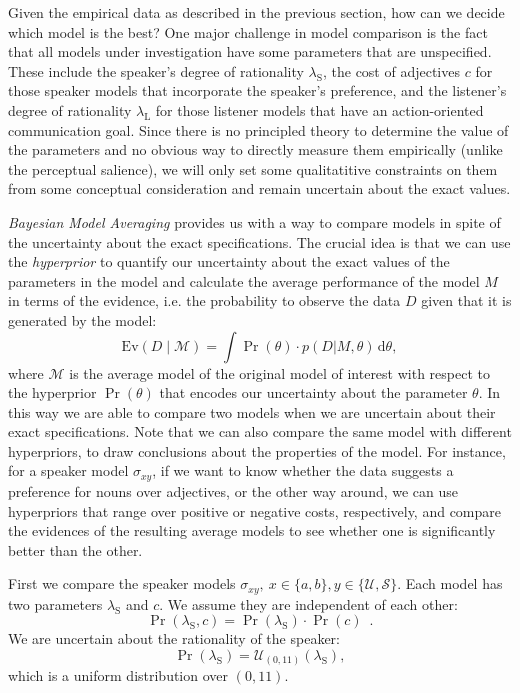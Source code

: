 Given the empirical data as described in the previous section, how can we decide which model is the best? One major challenge in model comparison is the fact that all models under investigation have some parameters that are unspecified. These include the speaker's degree of rationality $\lambda_\mathrm{S}$, the cost of adjectives $c$ for those speaker models that incorporate the speaker's preference, and the listener's degree of rationality $\lambda_\mathrm{L}$ for those listener models that have an action-oriented communication goal. Since there is no principled theory to determine the value of the parameters and no obvious way to directly measure them empirically (unlike the perceptual salience), we will only set some qualitatitive constraints on them from some conceptual consideration and remain uncertain about the exact values.   

\emph{Bayesian Model Averaging} provides us with a way to compare models in spite of the uncertainty about the exact specifications. The crucial idea is that we can use the \emph{hyperprior} to quantify our uncertainty about the exact values of the parameters in the model and calculate the average performance of the model $M$ in terms of the evidence, i.e. the probability to observe the data $D$ given that it is generated by the model: 
\begin{equation}\label{BMA}
\mathrm{Ev}(D \mid \mathcal{M})= \int \Pr(\theta) \cdot p(D | M, \theta)\, \mathrm{d}\theta,
\end{equation}
where $\mathcal{M}$ is the average model of the original model of interest with respect to the hyperprior $\Pr(\theta)$ that encodes our uncertainty about the parameter $\theta$. In this way we are able to compare two models when we are uncertain about their exact specifications. Note that we can also compare the same model with different hyperpriors, to draw conclusions about the properties of the model. For instance, for a speaker model $\sigma_{xy}$, if we want to know whether the data suggests a preference for nouns over adjectives, or the other way around, we can use hyperpriors that range over positive or negative costs, respectively, and compare the evidences of the resulting average models to see whether one is significantly better than the other. 

First we compare the speaker models $\sigma_{xy},\ x\in\{a,b\},y\in\{\mathcal{U},\mathcal{S}\}$. Each model has two parameters $\lambda_\mathrm{S}$ and $c$. We assume they are independent of each other:
\begin{equation}\label{hyper-speaker-independent}
\Pr(\lambda_\mathrm{S},c)=\Pr(\lambda_\mathrm{S}) \cdot \Pr(c) \enspace .
\end{equation}
We are uncertain about the rationality of the speaker:
\begin{equation}\label{hyper-speaker-lambda}
\Pr(\lambda_\mathrm{S})= \mathcal{U}_{(0,11)}(\lambda_\mathrm{S}),
\end{equation}
which is a uniform distribution over $(0,11)$. 

